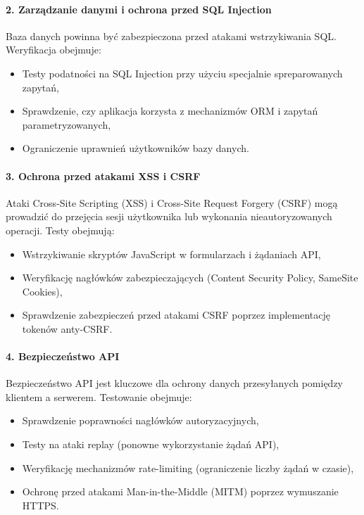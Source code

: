 \paragraph{2. Zarządzanie danymi i ochrona przed SQL Injection}
Baza danych powinna być zabezpieczona przed atakami wstrzykiwania SQL. Weryfikacja obejmuje:
\begin{itemize}
    \item Testy podatności na SQL Injection przy użyciu specjalnie spreparowanych zapytań,
    \item Sprawdzenie, czy aplikacja korzysta z mechanizmów ORM i zapytań parametryzowanych,
    \item Ograniczenie uprawnień użytkowników bazy danych.
\end{itemize}

\paragraph{3. Ochrona przed atakami XSS i CSRF}
Ataki Cross-Site Scripting (XSS) i Cross-Site Request Forgery (CSRF) mogą prowadzić do przejęcia sesji użytkownika lub wykonania nieautoryzowanych operacji. Testy obejmują:
\begin{itemize}
    \item Wstrzykiwanie skryptów JavaScript w formularzach i żądaniach API,
    \item Weryfikację nagłówków zabezpieczających (Content Security Policy, SameSite Cookies),
    \item Sprawdzenie zabezpieczeń przed atakami CSRF poprzez implementację tokenów anty-CSRF.
\end{itemize}

\paragraph{4. Bezpieczeństwo API}
Bezpieczeństwo API jest kluczowe dla ochrony danych przesyłanych pomiędzy klientem a serwerem. Testowanie obejmuje:
\begin{itemize}
    \item Sprawdzenie poprawności nagłówków autoryzacyjnych,
    \item Testy na ataki replay (ponowne wykorzystanie żądań API),
    \item Weryfikację mechanizmów rate-limiting (ograniczenie liczby żądań w czasie),
    \item Ochronę przed atakami Man-in-the-Middle (MITM) poprzez wymuszanie HTTPS.
\end{itemize}

